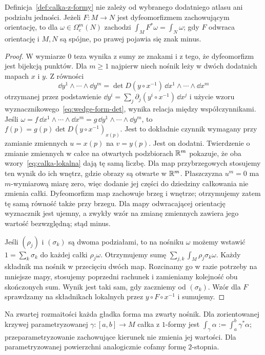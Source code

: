 \begin{twierdzenie}
\label{thm:calka-dobrze-okreslona}
Definicja~\ref{def:calka-z-formy} nie zależy od
wybranego dodatniego atlasu ani podziału jedności.
Jeżeli $F:M\to N$ jest dyfeomorfizmem zachowującym
orientację, to dla $\omega\in\Omega_c^m(N)$ zachodzi
$\int_M F^*\omega=\int_N\omega$; gdy $F$ odwraca
orientację i $M,N$ są spójne, po prawej pojawia się
znak minus.
\end{twierdzenie}
\begin{proof}
W wymiarze $0$ teza wynika z sumy ze znakami i z tego,
że dyfeomorfizm jest bijekcją punktów. Dla $m\geq1$
najpierw niech nośnik leży w dwóch dodatnich mapach
$x$ i $y$. Z równości
\[
 \dd y^1\wedge\cdots\wedge\dd y^m
 =\det D(y\circ x^{-1})\,
   \dd x^1\wedge\cdots\wedge\dd x^m
\]
otrzymanej przez podstawienie
$\dd y^i=\sum_j\partial_j(y^i\circ x^{-1})\,\dd x^j$
i użycie wzoru wyznacznikowego~\eqref{eq:wedge-form-det},
wynika relacja między współczynnikami.
Jeśli $\omega=f\,\dd x^1\wedge\cdots\wedge\dd x^m
=g\,\dd y^1\wedge\cdots\wedge\dd y^m$, to
$f(p)=g(p)\det D(y\circ x^{-1})_{x(p)}$.
Jest to dokładnie czynnik wymagany przy zamianie
zmiennych $u=x(p)$ na $v=y(p)$.
Jest on dodatni. Twierdzenie o zmianie zmiennych
w całce na otwartych podzbiorach $\mathbb{R}^m$ pokazuje,
że oba wzory~\eqref{eq:calka-lokalna} dają tę samą
liczbę. Dla map przybrzegowych stosujemy ten wynik
do ich wnętrz, gdzie obrazy są otwarte w $\mathbb{R}^m$.
Płaszczyzna $u^m=0$ ma $m$-wymiarową miarę zero,
więc dodanie jej części do dziedziny całkowania
nie zmienia całki. Dyfeomorfizm map zachowuje brzeg
i wnętrze; otrzymujemy zatem tę samą równość także
przy brzegu. Dla mapy odwracającej orientację wyznacznik
jest ujemny, a zwykły wzór na zmianę zmiennych
zawiera jego wartość bezwzględną; stąd minus.

Jeśli $(\rho_j)$ i $(\sigma_k)$ są dwoma podziałami,
to na nośniku $\omega$ możemy wstawić
$1=\sum_k\sigma_k$ do każdej całki $\rho_j\omega$.
Otrzymujemy sumę $\sum_{j,k}\int_M\rho_j\sigma_k\omega$.
Każdy składnik ma nośnik w przecięciu dwóch map.
Rozcinamy go w razie potrzeby na mniejsze mapy,
stosujemy poprzedni rachunek i zamieniamy kolejność
obu skończonych sum. Wynik jest taki sam, gdy
zaczniemy od $(\sigma_k)$. Wzór dla $F$ sprawdzamy
na składnikach lokalnych przez $y\circ F\circ x^{-1}$
i sumujemy.
\end{proof}

Na zwartej rozmaitości każda gładka forma ma zwarty
nośnik. Dla zorientowanej krzywej parametryzowanej
$\gamma:[a,b]\to M$ całka z $1$-formy jest
$\int_\gamma\alpha:=\int_a^b\gamma^*\alpha$;
przeparametryzowanie zachowujące kierunek nie zmienia
jej wartości. Dla parametryzowanej powierzchni
analogicznie cofamy formę $2$-stopnia.

